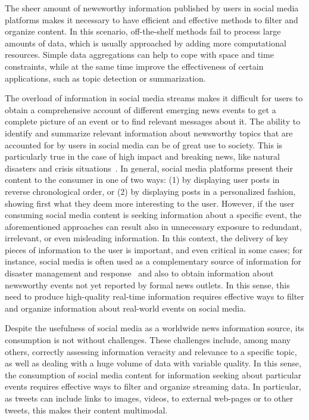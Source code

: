 The sheer amount of newsworthy information published by users in social media
platforms makes it necessary to have efficient and effective methods to filter
and organize content. 
%
In this scenario, off-the-shelf methods fail to process large amounts of data,
which is usually approached by adding more computational resources. 
%
Simple data aggregations can help to cope with space and time constraints,
while at the same time improve the effectiveness of certain applications, such
as topic detection or summarization. 


The overload of information in social media streams makes it difficult for users
to obtain a comprehensive account of different emerging news events to get a 
complete picture of an event or to find relevant messages about it.
%
The ability to identify and summarize relevant information about newsworthy
topics that are accounted for by users in social media can be of great use to
society.
%
This is particularly true in the case of high impact and breaking news, like
natural disasters and crisis situations~\cite{ICWSM1817816}.
%
In general, social media platforms present their content to the consumer in one
of two ways: (1) by displaying user posts in reverse chronological order, or (2)
by displaying posts in a personalized fashion, showing first what they deem more
interesting to the user.
%
However, if the user consuming social media content 
is seeking information about a specific event, the aforementioned approaches can
result also in unnecessary exposure to redundant, irrelevant, or even misleading
information.
%
In this context, the delivery of key pieces of information to the user is important,
and even critical in some cases; 
%
for instance, social media is often used as a complementary source of
information for disaster management and
response~\cite{ICWSM1817816,Sarmiento:2018:DDE:3201064.3201077}
and also to obtain information about newsworthy events not yet reported by
formal news outlets. 
%
In this sense, this need to produce high-quality real-time information requires 
effective ways to filter and organize information about real-world events on social media.
%

Despite the usefulness of social media as a worldwide news information source,
its consumption is not without challenges.
%
These challenges include, among many others, correctly assessing information
veracity and relevance to a specific topic, as well as dealing with a huge
volume of data with variable quality. 
%
In this sense, the consumption of social media content for information seeking 
about particular events requires effective ways to filter and organize streaming data.
%
%
%
In particular, as tweets can include links to images, videos, to
external web-pages or to other tweets, this makes their content multimodal.

